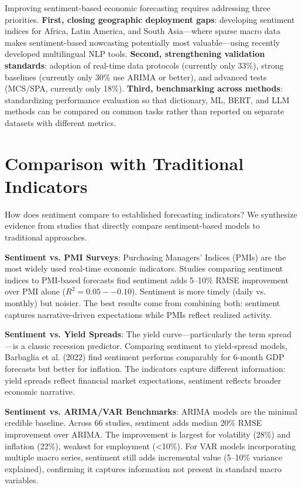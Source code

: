 \documentclass[11pt]{article}
\begin{document}
Improving sentiment-based economic forecasting requires addressing three priorities. \textbf{First, closing geographic deployment gaps}: developing sentiment indices for Africa, Latin America, and South Asia---where sparse macro data makes sentiment-based nowcasting potentially most valuable---using recently developed multilingual NLP tools. \textbf{Second, strengthening validation standards}: adoption of real-time data protocols (currently only 33\%), strong baselines (currently only 30\% use ARIMA or better), and advanced tests (MCS/SPA, currently only 18\%). \textbf{Third, benchmarking across methods}: standardizing performance evaluation so that dictionary, ML, BERT, and LLM methods can be compared on common tasks rather than reported on separate datasets with different metrics.

\section{Comparison with Traditional Indicators}

How does sentiment compare to established forecasting indicators? We synthesize evidence from studies that directly compare sentiment-based models to traditional approaches.

\textbf{Sentiment vs. PMI Surveys}: Purchasing Managers' Indices (PMIs) are the most widely used real-time economic indicators. Studies comparing sentiment indices to PMI-based forecasts find sentiment adds 5--10\% RMSE improvement over PMI alone ($R^2 = 0.05--0.10$). Sentiment is more timely (daily vs. monthly) but noisier. The best results come from combining both: sentiment captures narrative-driven expectations while PMIs reflect realized activity.

\textbf{Sentiment vs. Yield Spreads}: The yield curve---particularly the term spread---is a classic recession predictor. Comparing sentiment to yield-spread models, Barbaglia et al. (2022) find sentiment performs comparably for 6-month GDP forecasts but better for inflation. The indicators capture different information: yield spreads reflect financial market expectations, sentiment reflects broader economic narrative.

\textbf{Sentiment vs. ARIMA/VAR Benchmarks}: ARIMA models are the minimal credible baseline. Across 66 studies, sentiment adds median 20\% RMSE improvement over ARIMA. The improvement is largest for volatility (28\%) and inflation (22\%), weakest for employment (<10\%). For VAR models incorporating multiple macro series, sentiment still adds incremental value (5--10\% variance explained), confirming it captures information not present in standard macro variables.
\end{document}
